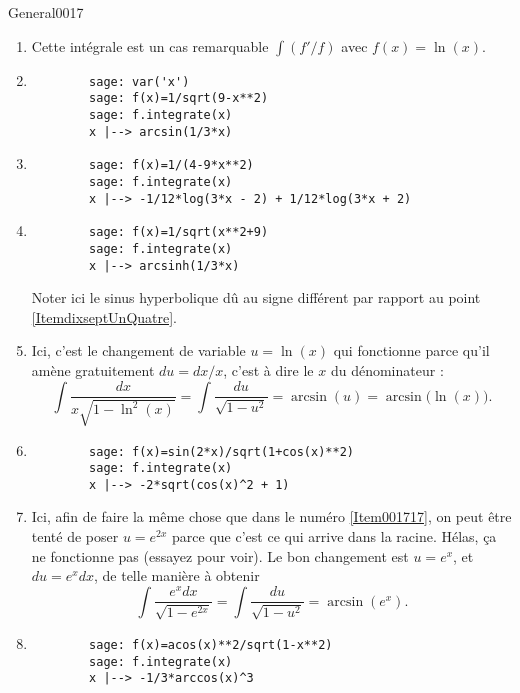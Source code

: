 \begin{corrige}{General0017}
\begin{enumerate}
\item
Cette intégrale est un cas remarquable $\int (f'/f)$ avec $f(x)=\ln(x)$.

\item\label{ItemdixseptUnQuatre}
	
	\begin{verbatim}
		sage: var('x')
		sage: f(x)=1/sqrt(9-x**2)
		sage: f.integrate(x)
		x |--> arcsin(1/3*x)
	\end{verbatim}


\item
	\begin{verbatim}
		sage: f(x)=1/(4-9*x**2)
		sage: f.integrate(x)   
		x |--> -1/12*log(3*x - 2) + 1/12*log(3*x + 2)
	\end{verbatim}
\item

	\begin{verbatim}
		sage: f(x)=1/sqrt(x**2+9)
		sage: f.integrate(x)     
		x |--> arcsinh(1/3*x)
	\end{verbatim}
	Noter ici le sinus hyperbolique dû au signe différent par rapport au point \ref{ItemdixseptUnQuatre}.
\item\label{Item001717}
Ici, c'est le changement de variable $u=\ln(x)$ qui fonctionne parce qu'il amène gratuitement $du=dx/x$, c'est à dire le $x$ du dénominateur :
\begin{equation}
	\int\frac{ dx }{ x\sqrt{1-\ln^2(x)} }=\int\frac{ du }{ \sqrt{1-u^2} }=\arcsin(u)=\arcsin\big( \ln(x) \big).
\end{equation}

\item

	\begin{verbatim}
		sage: f(x)=sin(2*x)/sqrt(1+cos(x)**2)
		sage: f.integrate(x)                 
		x |--> -2*sqrt(cos(x)^2 + 1)
	\end{verbatim}
	

\item
Ici, afin de faire la même chose que dans le numéro \ref{Item001717}, on peut être tenté de poser $u= e^{2x}$ parce que c'est ce qui arrive dans la racine. Hélas, ça ne fonctionne pas (essayez pour voir). Le bon changement est $u=e^x$, et $du= e^{x}dx$, de telle manière à obtenir
\begin{equation}
	\int\frac{  e^{x}dx }{ \sqrt{1- e^{2x}} }=\int\frac{ du }{ \sqrt{1-u^2} }=\arcsin(e^x).
\end{equation}

\item
	\begin{verbatim}
		sage: f(x)=acos(x)**2/sqrt(1-x**2)
		sage: f.integrate(x)              
		x |--> -1/3*arccos(x)^3
	\end{verbatim}


\end{enumerate}
\end{corrige}
